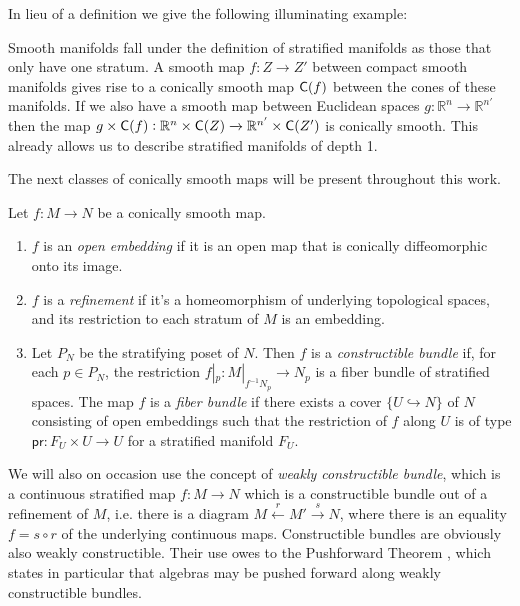 \documentclass[../text]{subfiles}
\begin{document}
In lieu of a definition we give the following illuminating example:
%
\begin{example}
    Smooth manifolds fall under the definition of stratified manifolds as those that only have one stratum. A smooth map $f: Z \xrightarrow{} Z'$ between compact smooth manifolds gives rise to a conically smooth map $\cone(f)$ between the cones of these manifolds. If we also have a smooth map between Euclidean spaces $g: \mathbb{R}^{n} \xrightarrow{} \mathbb{R}^{n'}$ then the map $g \times \cone(f): \mathbb{R}^{n} \times \cone (Z) \xrightarrow{} \mathbb{R}^{n'} \times \cone (Z')$ is conically smooth. This already allows us to describe stratified manifolds of depth 1.
\end{example}

The next classes of conically smooth maps will be present throughout this work.

\begin{definition}
    Let $f: M \rightarrow N$ be a conically smooth map.
    \begin{enumerate}
        \item $f$ is an \emph{open embedding} if it is an open map that is conically diffeomorphic onto its image.
        \item $f$ is a \emph{refinement} if it's a homeomorphism of underlying topological spaces, and its restriction to each stratum of $M$ is an embedding.
        \item Let $P_N$ be the stratifying poset of $N$. Then $f$ is a \emph{constructible bundle} if, for each $p \in P_N$, the restriction $f|_p: M|_{f^{-1} N_p} \rightarrow N_p$ is a fiber bundle of stratified spaces. The map $f$ is a \emph{fiber bundle} if there exists a cover $\{U\hookrightarrow N\}$ of $N$ consisting of open embeddings such that the restriction of $f$ along $U$ is of type $\mathsf{pr}\colon F_U\times U\to U$ for a stratified manifold $F_U$.
    \end{enumerate}
\end{definition}

\begin{remark}
    We will also on occasion use the concept of \emph{weakly constructible bundle}, which is a continuous stratified map $f: M \rightarrow N$ which is a constructible bundle out of a refinement of $M$, i.e. there is a diagram $M \xleftarrow{r} M' \xrightarrow{s} N$, where there is an equality $f = s \circ r$ of the underlying continuous maps. Constructible bundles are obviously also weakly constructible. Their use owes to the Pushforward Theorem \cite[Theorem 2.25]{aft_fhstrat}, which states in particular that algebras may be pushed forward along weakly constructible bundles. 
\end{remark}
\end{document}
